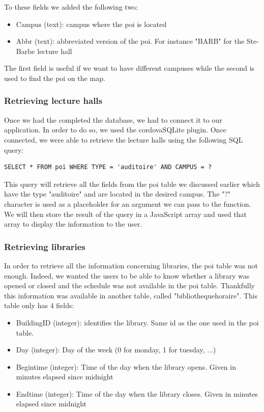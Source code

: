 \documentclass[11pt, a4paper]{report}
\begin{document}
To these fields we added the following two:
\begin{itemize}
\item Campus (text): campus where the poi is located
\item Abbr (text): abbreviated version of the poi. For instance "BARB" for the Ste-Barbe lecture hall
\end{itemize}

The first field is useful if we want to have different campuses while the second is used to find the poi on the map.

\subsubsection{Retrieving lecture halls}

Once we had the completed the database, we had to connect it to our application. In order to do so, we used the cordovaSQLite plugin. Once connected, we were able to retrieve the lecture halls using the following SQL query: 
\begin{verbatim}
SELECT * FROM poi WHERE TYPE = 'auditoire' AND CAMPUS = ?
\end{verbatim}

This query will retrieve all the fields from the poi table we discussed earlier which have the type "auditoire" and are located in the desired campus. The "?" character is used as a placeholder for an argument we can pass to the function. We will then store the result of the query in a JavaScript array and used that array to display the information to the user.

\subsubsection{Retrieving libraries}

In order to retrieve all the information concerning libraries, the poi table was not enough. Indeed, we wanted the users to be able to know whether a library was opened or closed and the schedule was not available in the poi table. Thankfully this information was available in another table, called "bibliotheque\textunderscore horaire". This table only has 4 fields:

\begin{itemize}
\item Building\textunderscore ID (integer): identifies the library. Same id as the one used in the poi table.
\item Day (integer): Day of the week (0 for monday, 1 for tuesday, ...)
\item Begin\textunderscore time (integer): Time of the day when the library opens. Given in minutes elapsed since midnight
\item End\textunderscore time (integer): Time of the day when the library closes. Given in minutes elapsed since midnight
\end{itemize}
\end{document}

